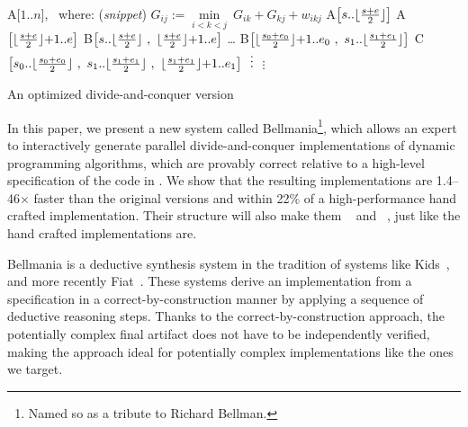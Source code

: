 \begin{algorithm}[b!]
\fontsize{9}{10}   %
\begin{algorithmic}
  \State A[$1..n$], ~where: \hfill{\normalsize (\textit{snippet})}
	      \State $G_{ij} := \underset{i<k<j}\min ~ G_{ik} + G_{kj} + w_{ikj}$
	    \EndFor
	  \EndFor
    \vspace{-5pt}
	\Else
	  \State A$\big[ s..\lfloor\frac{s+e}{2}\rfloor \big]$
	  \State A$\big[ \lfloor\frac{s+e}{2}\rfloor{+}1..e \big]$
	  \State B$\big[ s..\lfloor\frac{s+e}{2}\rfloor ~,~ \lfloor\frac{s+e}{2}\rfloor{+}1..e \big]$
	\EndIf
  \EndProcedure
	 \ldots
	\Else
	  \State B$\big[ \lfloor\frac{s_0+e_0}{2}\rfloor{+}1..e_0 ~,~ s_1..\lfloor\frac{s_1+e_1}{2}\rfloor \big]$
	  \State C$\big[ s_0..\lfloor\frac{s_0+e_0}{2}\rfloor ~,~ s_1..\lfloor\frac{s_1+e_1}{2}\rfloor ~,~ \lfloor\frac{s_1+e_1}{2}\rfloor{+}1..e_1 \big]$
	  \vspace{-5pt}
	  \State $\vdotswithin{C}$
	\EndIf
  \EndProcedure
    \vspace{-5pt}
    \State $\vdots$
  \EndProcedure
\end{algorithmic}
\caption{\label{intro:divide-and-conquer}
   An optimized divide-and-conquer version}
\end{algorithm}




In this paper, we present a new system called Bellmania\footnote{Named so as a tribute to Richard Bellman.}, which allows an expert to interactively generate parallel divide-and-conquer implementations of dynamic programming algorithms, which are provably correct relative to a high-level specification of the code in . We show that the resulting implementations are 1.4--46$\times$ faster than the original versions and within 22\% of a high-performance hand crafted implementation.
Their structure will also make them ~\cite{FOCS99/Frigo} and ~\cite{SODA14/Bender}, just like the hand crafted implementations are.


Bellmania is a deductive synthesis system in the tradition of systems like Kids~\cite{TSE90/Smith}, and more recently Fiat~\cite{POPL15/Delaware}. 
These systems derive an implementation from a specification in a correct-by-construction manner by applying a sequence of deductive reasoning steps. Thanks to the correct-by-construction approach, the potentially complex final artifact does not have to be independently verified, making the approach ideal for potentially complex implementations like the ones we target. 

